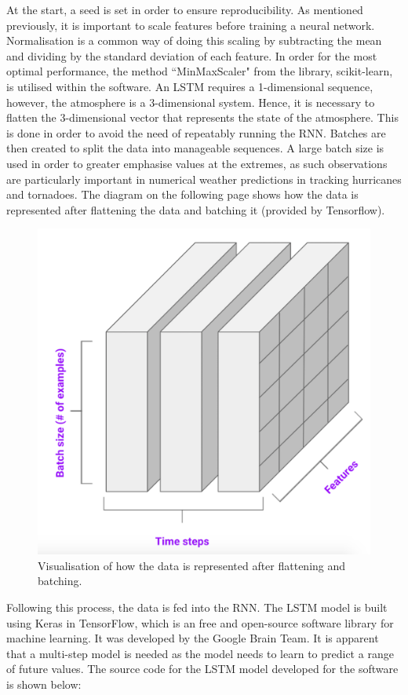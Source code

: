 At the start, a seed is set in order to ensure reproducibility. As mentioned previously, it is important to scale features before training a neural network. Normalisation is a common way of doing this scaling by subtracting the mean and dividing by the standard deviation of each feature. In order for the most optimal performance, the method ``MinMaxScaler" from the library, scikit-learn, is utilised within the software\cite{scikit-learn}. An LSTM requires a 1-dimensional sequence, however, the atmosphere is a 3-dimensional system. Hence, it is necessary to flatten the 3-dimensional vector that represents the state of the atmosphere. This is done in order to avoid the need of repeatably running the RNN. Batches are then created to split the data into manageable sequences. A large batch size is used in order to greater emphasise values at the extremes, as such observations are particularly important in numerical weather predictions in tracking hurricanes and tornadoes. The diagram on the following page shows how the data is represented after flattening the data and batching it (provided by Tensorflow)\cite{time_series}.

\begin{figure}[H]
    \centering
    \includegraphics[width=.5\linewidth]{Images/data_rnn.png}
    \caption{Visualisation of how the data is represented after flattening and batching.}
\end{figure}

Following this process, the data is fed into the RNN. The LSTM model is built using Keras in TensorFlow, which is an free and open-source software library for machine learning. It was developed by the Google Brain Team\cite{tensorflow}. It is apparent that a multi-step model is needed as the model needs to learn to predict a range of future values. The source code for the LSTM model developed for the software is shown below:

